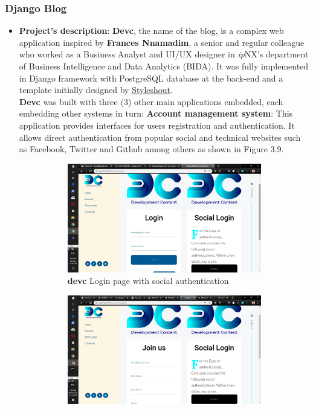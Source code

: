 \subsubsection{Django Blog}
\begin{itemize}
	\item \textbf{Project's description}: \textbf{Devc}, the name of the blog, is a complex web application inspired by \textbf{Frances Nnamadim}, a senior and regular colleague who worked as a Business Analyst and \ac{UI}/\ac{UX} designer in \textit{ip}NX's department of Business Intelligence and Data Analytics (BIDA). It was fully implemented in Django framework with PostgreSQL database at the back-end and a template initially designed by \href{https://www.styleshout.com/}{Styleshout}.\\
	
	\textbf{Devc} was built with three (3) other main applications embedded, each embedding other systems in turn:
	\subitem \textbf{Account management system}: This application provides interfaces for users registration and authentication. It allows direct authentication from popular social and technical websites such as Facebook, Twitter and Github among others as shown in Figure 3.9.
	\begin{figure}[!htbp]
		\centering
		\begin{subfigure}[b]{0.45\textwidth}
			\centering
			\includegraphics[width=\linewidth]{./devclogin}
			\caption{\textbf{devc} Login page with social authentication}
		\end{subfigure}
		\hfill
		\begin{subfigure}[b]{0.45\textwidth}
			\centering
			\includegraphics[width=\linewidth]{./devcsignup}

\end{subfigure}
\end{figure}
\end{itemize}
